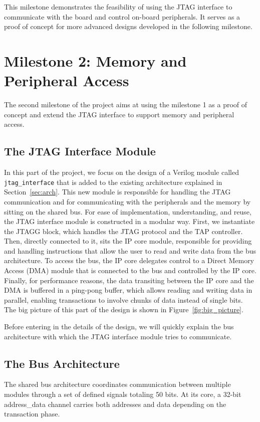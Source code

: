 \documentclass[a4paper,11pt,oneside]{report}
\begin{document}
This milestone demonstrates the feasibility of using the JTAG interface to communicate with the board and control on-board peripherals. 
It serves as a proof of concept for more advanced designs developed in the following milestone.

\section{Milestone 2: Memory and Peripheral Access}

The second milestone of the project aims at using the milestone 1 as a proof of concept and extend the JTAG interface to support memory and peripheral access.

\subsection{The JTAG Interface Module}

In this part of the project, we focus on the design of a Verilog module called \texttt{jtag_interface}
that is added to the existing architecture explained in Section~\ref{sec:arch}.
This new module is responsible for handling the JTAG communication and for communicating with the peripherals
and the memory by sitting on the shared bus.
For ease of implementation, understanding, and reuse, the JTAG interface module is constructed in a modular way.
First, we instantiate the JTAGG block, which handles the JTAG protocol and the TAP controller.
Then, directly connected to it, sits the IP core module, responsible for providing and handling instructions
that allow the user to read and write data from the bus architecture.
To access the bus, the IP core delegates control to a Direct Memory Access (DMA) module that is connected to the bus
and controlled by the IP core.
Finally, for performance reasons, the data transiting between the IP core and the DMA is buffered in a ping-pong buffer,
which allows reading and writing data in parallel, enabling transactions to involve chunks of data instead of single bits.
The big picture of this part of the design is shown in Figure~\ref{fig:big_picture}.

Before entering in the details of the design, we will quickly explain the bus architecture with which the JTAG interface module tries to communicate.

\subsection{The Bus Architecture}
The shared bus architecture coordinates communication between multiple modules through a set of defined signals totaling 50 bits.
At its core, a 32-bit address_data channel carries both addresses and data depending on the transaction phase.
\end{document}
